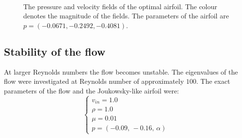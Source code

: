 \documentclass[12pt, a4paper]{article}
\begin{document}
        \begin{figure}[htbp]
            \centering
             \\
            \caption{The pressure and velocity fields of the optimal airfoil. The colour denotes the magnitude of the fields. The parameters of the airfoil are $p = (-0.0671,-0.2492,-0.4081)$.}
            \label{fig_opt_joukow}
        \end{figure}
        
    \subsection{Stability of the flow}
        At larger Reynolds numbers the flow becomes unstable. The eigenvalues of the flow were investigated at Reynolds number of approximately $100$. The exact parameters of the flow and the Joukowsky-like airfoil were:
        \begin{equation}
        \begin{cases}
            v_{in} = 1.0 \\
            \rho = 1.0 \\
            \mu = 0.01 \\
            p = (-0.09,\, -0.16,\, \alpha)
        \end{cases}
        \end{equation}
        
\end{document}
